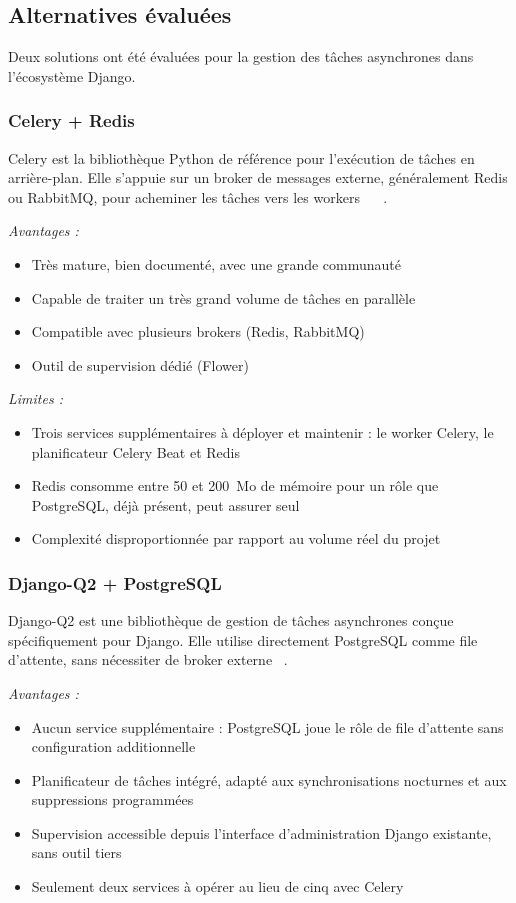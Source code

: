 \subsection{Alternatives évaluées}

Deux solutions ont été évaluées pour la gestion des tâches asynchrones
dans l'écosystème Django.

\subsubsection{Celery + Redis}

Celery est la bibliothèque Python de référence pour l'exécution de tâches
en arrière-plan. Elle s'appuie sur un broker de messages externe,
généralement Redis ou RabbitMQ, pour acheminer les tâches vers les
workers ~\cite{celery_dev} ~\cite{redis_dev}.

\textit{Avantages :}
\begin{itemize}
  \item Très mature, bien documenté, avec une grande communauté
  \item Capable de traiter un très grand volume de tâches en parallèle
  \item Compatible avec plusieurs brokers (Redis, RabbitMQ)
  \item Outil de supervision dédié (Flower)
\end{itemize}

\textit{Limites :}
\begin{itemize}
  \item Trois services supplémentaires à déployer et maintenir :
        le worker Celery, le planificateur Celery Beat et Redis
  \item Redis consomme entre 50 et 200~Mo de mémoire pour un rôle
        que PostgreSQL, déjà présent, peut assurer seul
  \item Complexité disproportionnée par rapport au volume réel du projet
\end{itemize}

\subsubsection{Django-Q2 + PostgreSQL}

Django-Q2 est une bibliothèque de gestion de tâches asynchrones conçue
spécifiquement pour Django. Elle utilise directement PostgreSQL comme
file d'attente, sans nécessiter de broker externe ~\cite{djangoq2_dev}.

\textit{Avantages :}
\begin{itemize}
  \item Aucun service supplémentaire : PostgreSQL joue le rôle
        de file d'attente sans configuration additionnelle
  \item Planificateur de tâches intégré, adapté aux synchronisations
        nocturnes et aux suppressions programmées
  \item Supervision accessible depuis l'interface d'administration
        Django existante, sans outil tiers
  \item Seulement deux services à opérer au lieu de cinq avec Celery
\end{itemize}


